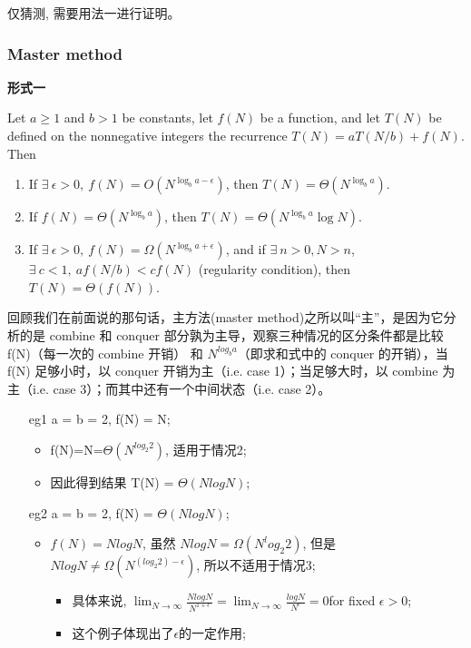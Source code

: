 \documentclass{article}
\begin{document}
仅猜测, 需要用法一进行证明。

\subsubsection{Master method}

\textbf{形式一}\par
Let $a\ge 1$ and $b> 1$ be constants, let $f(N)$ be a function, and let $T(N)$ be defined on the nonnegative integers the recurrence $T(N)=aT(N/b)+f(N)$. Then
\begin{enumerate}\small
    \item If $\exists\ \epsilon>0,\ f(N)=O(N^{\log_b a-\epsilon})$, then $T(N)=\Theta (N^{\log_b a})$.
    \item If $f(N)=\Theta(N^{\log_b a})$, then $T(N)=\Theta(N^{\log_b a}\log N)$. 
    \item If $\exists\ \epsilon>0,\ f(N)=\Omega(N^{\log_b a+\epsilon})$, and if $\exists\ n>0, N>n$, $\exists\ c<1,\ af(N/b)<cf(N)$ (regularity condition), then $T(N)=\Theta(f(N))$.
\end{enumerate}

回顾我们在前面说的那句话，主方法(master method)之所以叫“主”，是因为它分析的是 combine 和 conquer 部分孰为主导，观察三种情况的区分条件都是比较 f(N)（每一次的 combine 开销） 和 $N^{log_b a}$（即求和式中的 conquer 的开销），当 f(N) 足够小时，以 conquer 开销为主（i.e. case 1）；当足够大时，以 combine 为主（i.e. case 3）；而其中还有一个中间状态（i.e. case 2）。\par
\begin{itemize}
    \item [eg1] a = b = 2, f(N) = N;
    \begin{itemize}
        \item f(N)=N=$\Theta(N^{log_2 2})$, 适用于情况2;
        \item 因此得到结果 T(N) = $\Theta(Nlog N)$;
    \end{itemize}
    \item [eg2] a = b = 2, f(N) = $\Theta(N logN)$;
    \begin{itemize}
        \item $f(N) = N log N$, 虽然 $NlogN = \Omega(N^log_2 2)$, 但是 $NlogN \neq \Omega (N^{(log_2 2) - \epsilon})$, 所以不适用于情况3;
        \begin{itemize}
            \item 具体来说, $\lim_{N \to \infty} \frac{NlogN}{N^{1+\epsilon}} = \lim_{N \to \infty} \frac{logN}{N^{\epsilon}} = 0$for fixed $\epsilon > 0$;
            \item 这个例子体现出了$\epsilon$的一定作用;
        \end{itemize}
    \end{itemize}
\end{itemize}
\end{document}
